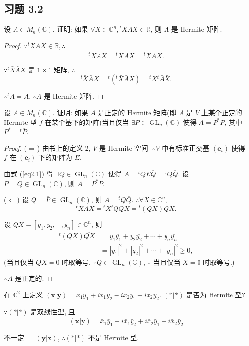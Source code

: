 \documentclass{ctexart}
\begin{document}
\subsection{习题 3.2}
\begin{exercise}[补充题 1]
    设 $A\in M_n(\mathbb{C})$. 证明: 如果 $\forall X\in\mathbb{C}^n,{}^tXA\overline{X}\in\mathbb{R}$, 则 $A$ 是 Hermite 矩阵.
\end{exercise}
\begin{proof}
    $\because{}^tXA\overline{X}\in\mathbb{R},\therefore$
    \[{}^tXA\overline{X}=\overline{{}^tXA\overline{X}}={}^t\bar{X}\bar{A}X.\]

    $\because{}^t\bar{X}\bar{A}X$ 是 $1\times1$ 矩阵, $\therefore$
    \[{}^t\bar{X}\bar{A}X={}^t({}^t\bar{X}\bar{A}X)={}^tX{}^t\bar{A}\bar{X}.\]

    $\therefore{}^t\bar{A}=A$. $\therefore A$ 是 Hermite 矩阵.
\end{proof}
\begin{exercise}[补充题 2]
    设 $A\in M_n(\mathbb{C})$. 证明: 如果 $A$ 是正定的 Hermite 矩阵(即 $A$ 是 $V$ 上某个正定的 Hermite 型 $f$ 在某个基下的矩阵)当且仅当 $\exists P\in\operatorname{GL}_n(\mathbb{C})$ 使得 $A=P^*P$, 其中 $P^*={}^t\overline{P}$.
\end{exercise}
\begin{proof}
    ($\Rightarrow$) 由书上的定义 2, $V$ 是 Hermite 空间. $\therefore V$ 中有标准正交基 $(\boldsymbol{e}_i)$ 使得 $f$ 在 $(\boldsymbol{e}_i)$ 下的矩阵为 $E$.

    由式 (\ref{eq2.1}) 得 $\exists Q\in\operatorname{GL}_n(\mathbb{C})$ 使得 $A={}^tQE\overline{Q}={}^tQ\overline{Q}$. 设 $P=\overline{Q}\in\operatorname{GL}_n(\mathbb{C})$, 则 $A=P^*P$.

    ($\Leftarrow$) 设 $Q=\overline{P}\in\operatorname{GL}_n(\mathbb{C})$, 则 $A={}^tQ\overline{Q}$. $\therefore\forall X\in\mathbb{C}^n$,
    \[{}^tXA\overline{X}={}^tX{}^tQ\overline{Q}\overline{X}={}^t(QX)\overline{QX}.\]

    设 $QX=[y_1,y_2,\cdots,y_n]\in\mathbb{C}^n$, 则
    \begin{align*}
        {}^t(QX)\overline{QX} & =y_1\overline{y_1}+y_2\overline{y_2}+\cdots+y_n\overline{y_n} \\
        & =|y_1|^2+|y_2|^2+\cdots+|y_n|^2\geq0,
    \end{align*}
    (当且仅当 $QX=0$ 时取等号. $\because Q\in\operatorname{GL}_n(\mathbb{C})$, $\therefore$ 当且仅当 $X=0$ 时取等号.)

    $\therefore A$ 是正定的.
\end{proof}
\begin{exercise}[补充题 3]
    在 $\mathbb{C}^2$ 上定义 $(\boldsymbol{x}|\boldsymbol{y})=x_1y_1+ix_1y_2-ix_2y_1+ix_2y_2$. $(*|*)$ 是否为 Hermite 型?
\end{exercise}
\begin{solution}
    $\because(*|*)$ 是双线性型, 且
    \[\overline{(\boldsymbol{x}|\boldsymbol{y})}=\bar{x}_1\bar{y}_1-i\bar{x}_1\bar{y}_2+i\bar{x}_2\bar{y}_1-i\bar{x}_2\bar{y}_2\]

    不一定 $=(\boldsymbol{y}|\boldsymbol{x})$, $\therefore(*|*)$ 不是 Hermite 型.
\end{solution}
\end{document}
